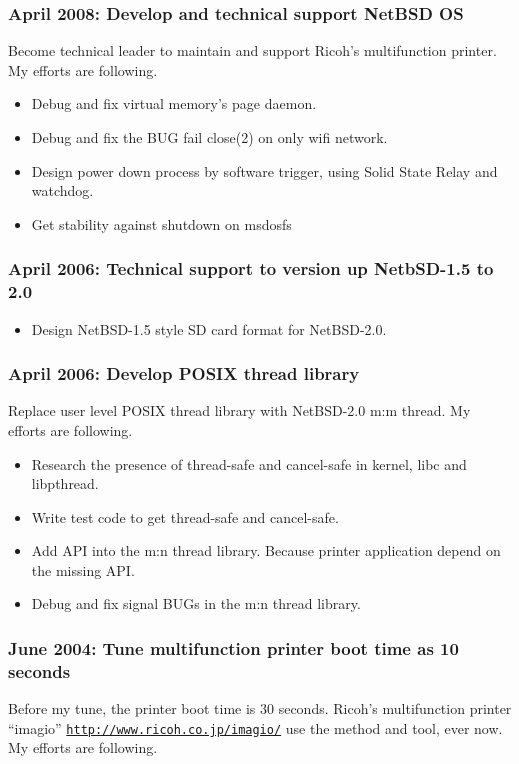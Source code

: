 \documentclass[letterpaper]{article}
\begin{document}
\subsubsection*{April 2008: Develop and technical support NetBSD OS}
Become technical leader to maintain and support Ricoh's multifunction printer.
My efforts are following.
\begin{itemize}
  \item Debug and fix virtual memory's page daemon.
  \item Debug and fix the BUG fail close(2) on only wifi network.
  \item Design power down process by software trigger, using Solid State Relay and watchdog.
  \item Get stability against shutdown on msdosfs
\end{itemize}

\subsubsection*{April 2006: Technical support to version up NetbSD-1.5 to 2.0}

\begin{itemize}
  \item Design NetBSD-1.5 style SD card format for NetBSD-2.0.
\end{itemize}

\subsubsection*{April 2006: Develop POSIX thread library}
Replace user level POSIX thread library with NetBSD-2.0 m:m thread.
My efforts are following.
\begin{itemize}
  \item Research the presence of thread-safe and cancel-safe in kernel, libc and libpthread.
  \item Write test code to get thread-safe and cancel-safe.
  \item Add API into the m:n thread library. Because printer application depend on the missing API.
  \item Debug and fix signal BUGs in the m:n thread library.
\end{itemize}

\subsubsection*{June 2004: Tune multifunction printer boot time as 10 seconds}
Before my tune, the printer boot time is 30 seconds.
Ricoh's multifunction printer ``imagio'' \href{http://www.ricoh.co.jp/imagio/}{\tt http://www.ricoh.co.jp/imagio/} use the method and tool, ever now.
My efforts are following.
\end{document}
